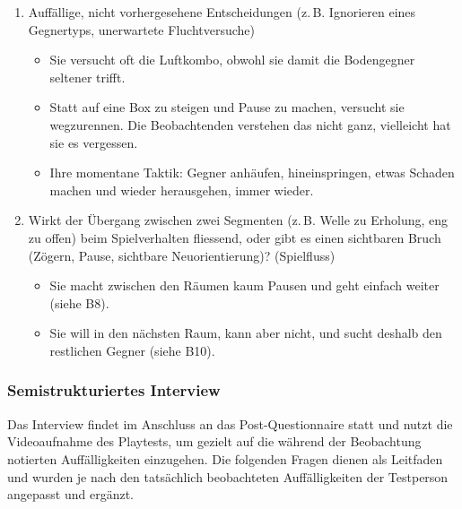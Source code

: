 \documentclass[../Main.tex]{subfiles}
\begin{document}
\begin{enumerate}[label=\textbf{B\arabic*}, leftmargin=1.5cm, itemsep=0.8em, resume]
\item Auffällige, nicht vorhergesehene Entscheidungen (z.\,B. Ignorieren eines Gegnertyps, unerwartete Fluchtversuche)
    \begin{itemize}[nosep]
        \item Sie versucht oft die Luftkombo, obwohl sie damit die Bodengegner seltener trifft.
        \item Statt auf eine Box zu steigen und Pause zu machen, versucht sie wegzurennen. Die Beobachtenden verstehen das nicht ganz, vielleicht hat sie es vergessen.
        \item Ihre momentane Taktik: Gegner anhäufen, hineinspringen, etwas Schaden machen und wieder herausgehen, immer wieder.
    \end{itemize}

\item Wirkt der Übergang zwischen zwei Segmenten (z.\,B. Welle zu Erholung, eng zu offen) beim Spielverhalten fliessend, oder gibt es einen sichtbaren Bruch (Zögern, Pause, sichtbare Neuorientierung)? \hfill (Spielfluss)
    \begin{itemize}[nosep]
        \item Sie macht zwischen den Räumen kaum Pausen und geht einfach weiter (siehe B8).
        \item Sie will in den nächsten Raum, kann aber nicht, und sucht deshalb den restlichen Gegner (siehe B10).
    \end{itemize}
\end{enumerate}

\subsubsection{Semistrukturiertes Interview}

Das Interview findet im Anschluss an das Post-Questionnaire statt und nutzt die Videoaufnahme des Playtests, um gezielt auf die während der Beobachtung notierten Auffälligkeiten einzugehen. Die folgenden Fragen dienen als Leitfaden und wurden je nach den tatsächlich beobachteten Auffälligkeiten der Testperson angepasst und ergänzt.
\end{document}
